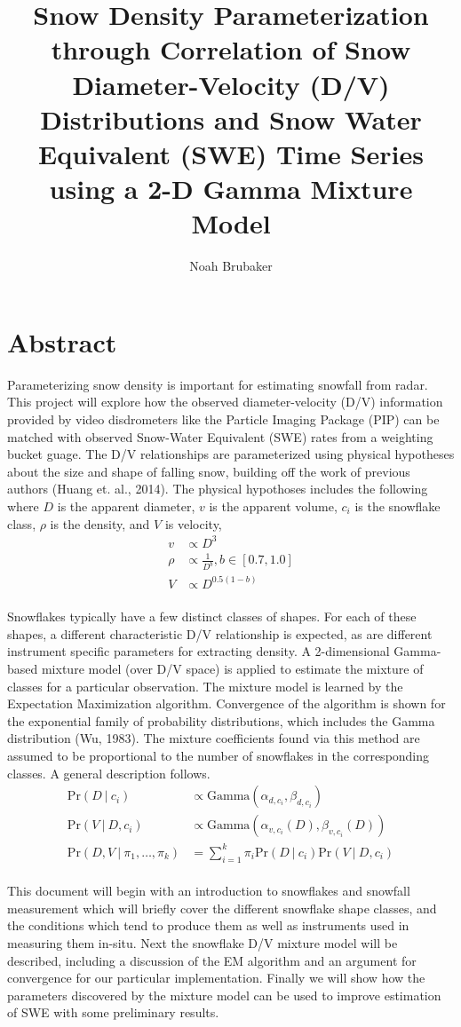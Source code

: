 \documentclass[10pt,a4paper]{article}
\author{Noah Brubaker}
\title{Snow Density Parameterization through Correlation of Snow Diameter-Velocity (D/V) Distributions and Snow Water Equivalent (SWE) Time Series using a 2-D Gamma Mixture Model}
\newcommand{\given}{\vert}
\newcommand{\pr}[1]{\text{Pr}\f{#1}}
\newcommand{\f}[1]{\left(#1\right)}
\newcommand{\gammf}[1]{\text{Gamma}\f{#1}}
\begin{document}
\maketitle

\section*{Abstract}
 Parameterizing snow density is important for estimating snowfall from radar. This project will explore how the observed diameter-velocity (D/V) information provided by video disdrometers like the Particle Imaging Package (PIP) can be matched with observed Snow-Water Equivalent (SWE) rates from a weighting bucket guage. The D/V relationships are parameterized using physical hypotheses about the size and shape of falling snow, building off the work of previous authors (Huang et. al., 2014). The physical hypothoses includes the following where $D$ is the apparent diameter, $v$ is the apparent volume, $c_i$ is the snowflake class, $\rho$ is the density, and $V$ is velocity,
  \begin{align}
    v &\propto D^3\\
    \rho &\propto \frac{1}{D^b}, b \in [0.7,1.0]\\
    V &\propto D^{0.5(1-b)}
  \end{align}
  \\
  Snowflakes typically have a few distinct classes of shapes. For each of these shapes, a different characteristic D/V relationship is expected, as are different instrument specific parameters for extracting density. A 2-dimensional Gamma-based mixture model (over D/V space) is applied to estimate the mixture of classes for a particular observation. The mixture model is learned by the Expectation Maximization algorithm. Convergence of the algorithm is shown for the exponential family of probability distributions, which includes the Gamma distribution (Wu, 1983). The mixture coefficients found via this method are assumed to be proportional to the number of snowflakes in the corresponding classes. A general description follows.
  \begin{align}
    \pr{D~\given~c_i} &\propto \gammf{\alpha_{d,c_i},\beta_{d,c_i}}\\
    \pr{V~\given~D, c_i} &\propto \gammf{\alpha_{v,c_i}(D),\beta_{v,c_i}(D)}\\
    \pr{D,V~\given~\pi_1,\ldots,\pi_k} &= \sum_{i=1}^{k}\pi_i\pr{D~\given~c_i}\pr{V~\given~D,c_i}
  \end{align}
  \\
  This document will begin with an introduction to snowflakes and snowfall measurement which will briefly cover the different snowflake shape classes, and the conditions which tend to produce them as well as instruments used in measuring them in-situ. Next the snowflake D/V mixture model will be described, including a discussion of the EM algorithm and an argument for convergence for our particular implementation. Finally we will show how the parameters discovered by the mixture model can be used to improve estimation of SWE with some preliminary results.
  
\end{document}
